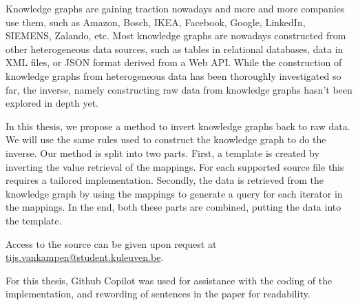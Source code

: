 Knowledge graphs are gaining traction nowadays and more and more companies use them, such as Amazon, Bosch, IKEA, Facebook, Google, LinkedIn, SIEMENS, Zalando, etc. Most knowledge graphs are nowadays constructed from other heterogeneous data sources, such as tables in relational databases, data in XML files, or JSON format derived from a Web API. While the construction of knowledge graphs from heterogeneous data has been thoroughly investigated so far, the inverse, namely constructing raw data from knowledge graphs hasn't been explored in depth yet. 

In this thesis, we propose a method to invert knowledge graphs back to raw data. We will use the same rules used to construct the knowledge graph to do the inverse. Our method is split into two parts. First, a template is created by inverting the value retrieval of the mappings. For each supported source file this requires a tailored implementation. Secondly, the data is retrieved from the knowledge graph by using the mappings to generate a query for each iterator in the mappings. In the end, both these parts are combined, putting the data into the template.

Access to the source can be given upon request at \href{mailto:tijs.vankampen@student.kuleuven.be}{tijs.vankampen@student.kuleuven.be}. 

For this thesis, Github Copilot was used for assistance with the coding of the implementation, and rewording of sentences in the paper for readability.

